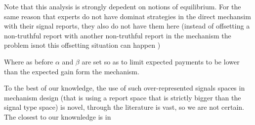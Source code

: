 Note that this analysis is strongly depedent on notions of equilibrium. For the same reason that experts do not have dominat strategies in the direct mechansim with their signal reports, they also do not have them here (instead of offsetting a non-truthful report with another non-truthful report in the mechanism the problem isnot this offsetting situation can happen )


Where as before $\alpha$ and $\beta$ are set so as to limit expected payments to be lower than the expected gain form the mechanism. 

To the best of our knowledge, the use of such over-represented signals spaces in mechanism design (that is using a report space that is strictly bigger than the signal type space) is novel, through the literature is vast, so we are not certain. The closest to our knownledge is in 



